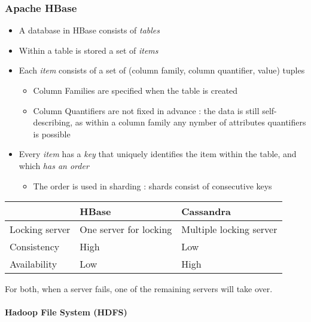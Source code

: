 \subsubsection{Apache HBase}

\begin{itemize}
    \item A database in HBase consists of \textit{tables}
    \item Within a table is stored a set of \textit{items}
    \item Each \textit{item} consists of a set of (column family, column quantifier, value) tuples
    \begin{itemize}
        \item Column Families are specified when the table is created
        \item Column Quantifiers are not fixed in advance : the data is still self-describing, as within a column family any nymber of attributes quantifiers is possible
    \end{itemize}
    \item Every \textit{item} has a \textit{key} that uniquely identifies the item within the table, and which \textit{has an order}
    \begin{itemize}
        \item The order is used in sharding : shards consist of consecutive keys
    \end{itemize}
\end{itemize}

\begin{center}
\begin{tabular}{|l|l|l|}
\hline 
  & HBase & Cassandra \\ 
\hline 
Locking server & One server for locking & Multiple locking server \\ 
\hline 
Consistency & High & Low \\ 
\hline 
Availability & Low & High \\ 
\hline 
\end{tabular} 
\end{center}

For both, when a server fails, one of the remaining servers will take over.

\paragraph{Hadoop File System (HDFS)}

